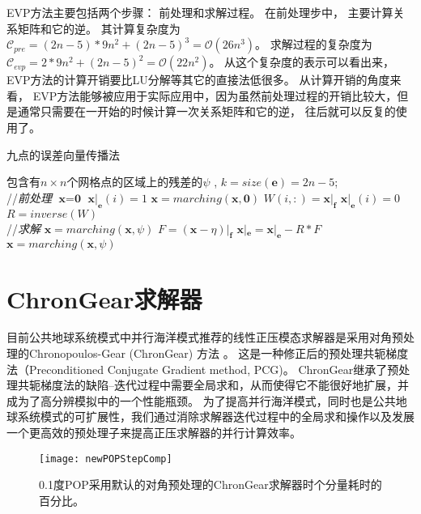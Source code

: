  
EVP方法主要包括两个步骤： 前处理和求解过程。 
在前处理步中， 主要计算关系矩阵和它的逆。 其计算复杂度为$\mathcal{C}_{pre}=
(2n-5)* 9n^2 + (2n-5)^3 = \mathcal {O} (26n^3)$。 
求解过程的复杂度为$\mathcal{C}_{evp}= 2* 9n^2 + (2n-5)^2 = \mathcal{O} (22n^2)$。 
从这个复杂度的表示可以看出来，EVP方法的计算开销要比LU分解等其它的直接法低很多。 
从计算开销的角度来看， EVP方法能够被应用于实际应用中，因为虽然前处理过程的开销比较大，但是通常只需要在一开始的时候计算一次关系矩阵和它的逆， 往后就可以反复的使用了。

\begin{algorithm}[t!]
\caption{九点的误差向量传播法}
\label{alg:evp}
\begin{algorithmic}[1]
\REQUIRE 包含有$n\times n$个网格点的区域上的残差的$\psi$ , $k = size(\textbf{e})=2n-5$; \\
//\qquad \textit{前处理}
\STATE  $\textbf{x} = \textbf{0}$
\STATE $\textbf{x}|_\textbf{e}(i) = 1$
\STATE $\textbf{x} = marching(\textbf{x},\textbf{0})$
\STATE $W(i,:) = \textbf{x}|_\textbf{f}$
\STATE $\textbf{x}|_\textbf{e}(i) = 0$
\ENDFOR
\STATE $R = inverse(W)$ \\
//\qquad \textit{求解 }
\STATE $\textbf{x}= marching(\textbf{x},\psi)$
\STATE $F = (\textbf{x} - \eta)|_\textbf{f}$
\STATE $\textbf{x}|_\textbf{e} =\textbf{x}|_\textbf{e} - R*F$
\STATE $\textbf{x} = marching(\textbf{x},\psi)$
\end{algorithmic}
\end{algorithm}

\section{ChronGear求解器}

目前公共地球系统模式中并行海洋模式推荐的线性正压模态求解器是采用对角预处理的Chronopoulos-Gear (ChronGear) 方法
\cite{dAzevedo1999lapack}。 这是一种修正后的预处理共轭梯度法（Preconditioned Conjugate
Gradient method, PCG)。 
ChronGear继承了预处理共轭梯度法的缺陷--迭代过程中需要全局求和，从而使得它不能很好地扩展，并成为了高分辨模拟中的一个性能瓶颈。
为了提高并行海洋模式，同时也是公共地球系统模式的可扩展性，我们通过消除求解器迭代过程中的全局求和操作以及发展一个更高效的预处理子来提高正压求解器的并行计算效率。


\begin {figure}
\centering
\texttt{[image: newPOPStepComp]}
\caption[] {0.1度POP采用默认的对角预处理的ChronGear求解器时个分量耗时的百分比。\label{fig:StepComp}}
\end{figure}

